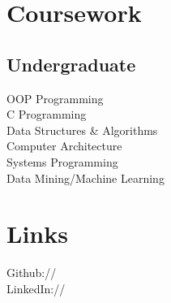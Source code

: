 \documentclass[]{deedy-resume-openfont}
\begin{document}
\begin{minipage}[t]{0.33\textwidth}
\sectionsep


\section{Coursework}
\subsection{Undergraduate}
OOP Programming \\
C Programming \\
Data Structures \& Algorithms \\
Computer Architecture \\
Systems Programming\\
Data Mining/Machine Learning\\
\sectionsep




\section{Links} 
Github:// \href{https://github.com/nidarshans}{} \\
LinkedIn://  \href{https://www.linkedin.com/in/nidarshan-siddegowda-a70039193}{} \\
\sectionsep








%
%

\end{minipage} 
\hfill
\end{document}
